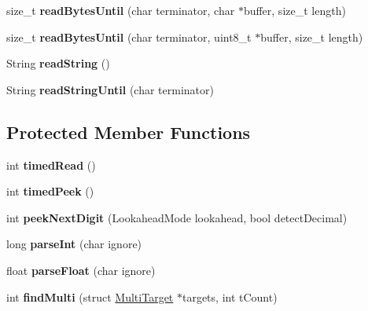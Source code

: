 \begin{DoxyCompactItemize}
\item 
size\+\_\+t {\bfseries read\+Bytes\+Until} (char terminator, char $\ast$buffer, size\+\_\+t length)\hypertarget{class_stream_af84672a4fb2620466958d3118d4fea00}{}\label{class_stream_af84672a4fb2620466958d3118d4fea00}

\item 
size\+\_\+t {\bfseries read\+Bytes\+Until} (char terminator, uint8\+\_\+t $\ast$buffer, size\+\_\+t length)\hypertarget{class_stream_a432e1b8520b03a845264789fcb9c1a10}{}\label{class_stream_a432e1b8520b03a845264789fcb9c1a10}

\item 
String {\bfseries read\+String} ()\hypertarget{class_stream_a1c60bdda2b65d78e5a1362d51b856c5a}{}\label{class_stream_a1c60bdda2b65d78e5a1362d51b856c5a}

\item 
String {\bfseries read\+String\+Until} (char terminator)\hypertarget{class_stream_a6a409da87c552909260d8cc428c5ca70}{}\label{class_stream_a6a409da87c552909260d8cc428c5ca70}

\end{DoxyCompactItemize}
\subsection*{Protected Member Functions}
\begin{DoxyCompactItemize}
\item 
int {\bfseries timed\+Read} ()\hypertarget{class_stream_a416a0ada5ed3c9d27f1e72c7d73f0aa1}{}\label{class_stream_a416a0ada5ed3c9d27f1e72c7d73f0aa1}

\item 
int {\bfseries timed\+Peek} ()\hypertarget{class_stream_ae326bf60a3c5276836526710871046fe}{}\label{class_stream_ae326bf60a3c5276836526710871046fe}

\item 
int {\bfseries peek\+Next\+Digit} (Lookahead\+Mode lookahead, bool detect\+Decimal)\hypertarget{class_stream_a3dbc4937689c81b76f4ab16e253e85e0}{}\label{class_stream_a3dbc4937689c81b76f4ab16e253e85e0}

\item 
long {\bfseries parse\+Int} (char ignore)\hypertarget{class_stream_ae37760d5dbfe38e9b9ab403d304c51d8}{}\label{class_stream_ae37760d5dbfe38e9b9ab403d304c51d8}

\item 
float {\bfseries parse\+Float} (char ignore)\hypertarget{class_stream_a5dcf499b28028a5c76f5f9cfe1b73785}{}\label{class_stream_a5dcf499b28028a5c76f5f9cfe1b73785}

\item 
int {\bfseries find\+Multi} (struct \hyperlink{struct_stream_1_1_multi_target}{Multi\+Target} $\ast$targets, int t\+Count)\hypertarget{class_stream_a5fb669d95dbf5b7b8a8e900c53d62a1e}{}\label{class_stream_a5fb669d95dbf5b7b8a8e900c53d62a1e}

\end{DoxyCompactItemize}

